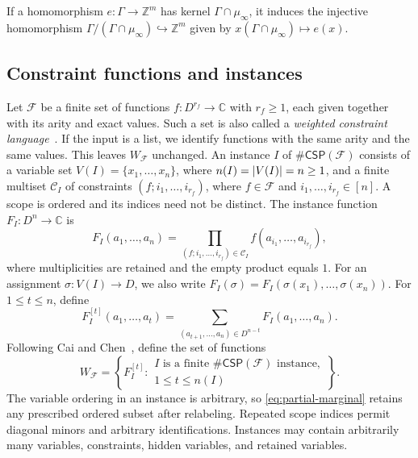 \documentclass[11pt,letterpaper,onecolumn]{article}
\theoremstyle{plain}
\theoremstyle{definition}
\theoremstyle{remark}
\newcommand{\AlgNums}{\mathbb C}
\newcommand{\cF}{\mathcal F}
\newcommand{\CSP}[1]{\mathsf{\#CSP}(#1)}
\DeclarePairedDelimiter{\abs}{\lvert}{\rvert}
\begin{document}
If a homomorphism $e:\Gamma\to\mathbb Z^m$ has kernel
$\Gamma\cap\mu_\infty$, it induces the injective homomorphism
$\Gamma/(\Gamma\cap\mu_\infty)\hookrightarrow\mathbb Z^m$ given by
$x(\Gamma\cap\mu_\infty)\mapsto e(x)$.

\subsection{Constraint functions and instances}
\label{subsec:constraint-instances}

Let $\cF$ be a finite set of functions $f:D^{r_f}\to\AlgNums$ with
$r_f\ge1$, each given together with its arity and exact values.  Such a set
is also called a \emph{weighted constraint language}~\cite{CaiChen2017}.
If the input is a list, we identify functions with the same arity and the
same values. This leaves $W_{\cF}$ unchanged.  An instance $I$ of
$\CSP{\cF}$ consists of a variable set
$V(I)=\{x_1,\ldots,x_n\}$, where $n(I)=\abs{V(I)}=n\ge1$, and a finite
multiset $\mathcal C_I$ of constraints $(f;i_1,\ldots,i_{r_f})$, where
$f\in\cF$ and $i_1,\ldots,i_{r_f}\in[n]$.  A scope is ordered and its
indices need not be distinct.  The instance function $F_I:D^n\to\AlgNums$
is
\begin{equation}
  F_I(a_1,\ldots,a_n)
  =\prod_{(f;i_1,\ldots,i_{r_f})\in\mathcal C_I}
      f(a_{i_1},\ldots,a_{i_{r_f}}),
  \label{eq:instance-function}
\end{equation}
where multiplicities are retained and the empty product equals $1$.
For an assignment $\sigma:V(I)\to D$, we also write
$F_I(\sigma)=F_I(\sigma(x_1),\ldots,\sigma(x_n))$.
For $1\le t\le n$, define
\begin{equation}
  F_I^{[t]}(a_1,\ldots,a_t)
  =\sum_{(a_{t+1},\ldots,a_n)\in D^{n-t}}
      F_I(a_1,\ldots,a_n).
  \label{eq:partial-marginal}
\end{equation}
Following Cai and Chen~\cite{CaiChen2017}, define the set of functions
\begin{equation*}
  W_{\cF}
  =\left\{F_I^{[t]}:
    \begin{array}{l}
      I\text{ is a finite }\CSP{\cF}\text{ instance},\\
      1\le t\le n(I)
    \end{array}
    \right\}.
\end{equation*}
The variable ordering in an instance is arbitrary, so
\eqref{eq:partial-marginal} retains any prescribed ordered subset after
relabeling.  Repeated scope indices permit diagonal minors and arbitrary
identifications.  Instances may contain arbitrarily many variables,
constraints, hidden variables, and retained variables.
\end{document}
